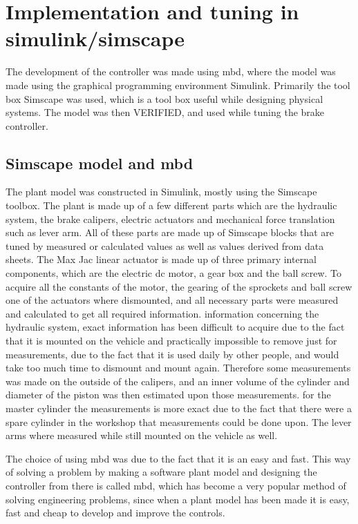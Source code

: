 \documentclass[a4paper,11pt]{kth-mag}
\begin{document}
\section{Implementation and tuning in simulink/simscape}

The development of the controller was made using \gls{mbd}, where the model was made using the graphical programming environment Simulink. Primarily the tool box Simscape was used, which is a tool box useful while designing physical systems. The model was then VERIFIED, and used while tuning the brake controller. 

\subsection{Simscape model and \gls{mbd}}
The plant model was constructed in Simulink, mostly using the Simscape toolbox. The plant is made up of a few different parts which are the hydraulic system, the brake calipers, electric actuators and mechanical force translation such as lever arm. All of these parts are made up of Simscape blocks that are tuned by measured or calculated values as well as values derived from data sheets. The Max Jac linear actuator is made up of three primary internal components, which are the electric \gls{dc} motor, a gear box and the ball screw. To acquire all the constants of the motor, the gearing of the sprockets and ball screw one of the actuators where dismounted, and all necessary parts were measured and calculated to get all required information. information concerning the hydraulic system, exact information has been difficult to acquire due to the fact that it is mounted on the vehicle and practically impossible to remove just for measurements, due to the fact that it is used daily by other people, and would take too much time to dismount and mount again. Therefore some measurements was made on the outside of the calipers, and an inner volume of the cylinder and diameter of the piston was then estimated upon those measurements. for the master cylinder the measurements is more exact due to the fact that there were a spare cylinder in the workshop that measurements could be done upon. The lever arms where measured while still mounted on the vehicle as well. 

The choice of using \gls{mbd} was due to the fact that it is an easy and fast. This way of solving a problem by making a software plant model and designing the controller from there is called \gls{mbd}, which has become a very popular method of solving engineering problems, since when a plant model has been made it is easy, fast and cheap to develop and improve the controls\cite{2010-01-1999}. 
\end{document}
